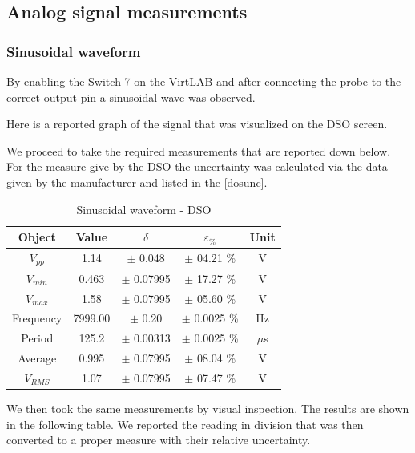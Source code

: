 \documentclass[../main.tex]{subfiles}
\begin{document}
\subsection{Analog signal measurements}



\subsubsection*{Sinusoidal waveform}

By enabling the Switch 7 on the VirtLAB and after connecting the probe to the correct output pin a sinusoidal wave was observed.

Here is a reported graph of the signal that was visualized on the DSO screen.


We proceed to take the required measurements that are reported down below.
For the measure give by the DSO the uncertainty was calculated via the data given by the manufacturer and listed in the \autoref{dosunc}.

\begin{table}[h!]
\centering	

\begin{tabular}{ccccc}
\textbf{Object} & \textbf{Value} & \textbf{$\delta$} & \textbf{$\varepsilon_{\%}$} &  \textbf{Unit} \\
\hline
 $V_{pp}$ & 1.14 & $\pm$ 0.048 & $\pm$ 04.21 \% &  V \\
 \hline
 $V_{min}$ & 0.463  & $\pm$ 0.07995 & $\pm$ 17.27 \% &  V \\
 \hline
 $V_{max}$ & 1.58  & $\pm$ 0.07995 & $\pm$ 05.60 \% &  V  \\
 \hline
 Frequency & 7999.00  & $\pm$ 0.20 & $\pm$ 0.0025 \% &  Hz \\
 \hline
 Period & 125.2 & $\pm$ 0.00313 & $\pm$ 0.0025 \%  &  $\mu$s \\
 \hline
 Average & 0.995  & $\pm$ 0.07995 & $\pm$ 08.04 \% &  V \\ 
 \hline
 $V_{RMS}$ & 1.07 & $\pm$ 0.07995 & $\pm$ 07.47 \% &  V \\
 

\end{tabular}
\caption*{Sinusoidal waveform - DSO}
\end{table}

We then took the same measurements by visual inspection. The results are shown in the following table. We reported the reading in division that was then converted to a proper measure with their relative uncertainty.
\end{document}
